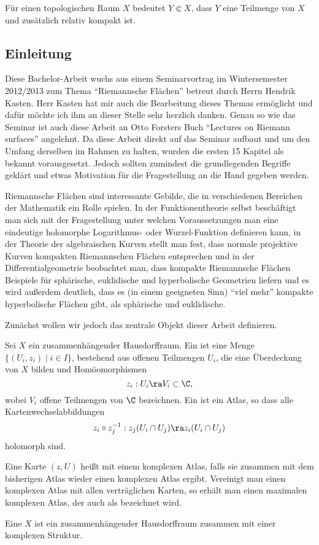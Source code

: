 Für einen topologischen Raum $X$ bedeutet $Y \Subset X$, dass $Y$
eine Teilmenge von $X$ und zusätzlich relativ kompakt ist.

\subsection{Einleitung}
\label{sec:einleitung}

Diese Bachelor-Arbeit wuchs aus einem Seminarvortrag im Wintersemester
2012/2013 zum Thema "`Riemannsche Flächen"' betreut durch Herrn Hendrik
Kasten. Herr Kasten hat mir auch die Bearbeitung dieses Themas
ermöglicht und dafür möchte ich ihm an dieser Stelle sehr herzlich
danken. Genau so wie das Seminar ist auch diese Arbeit an Otto Forsters
Buch "`Lectures on Riemann surfaces"' \cite{For} angelehnt. Da diese
Arbeit direkt auf das Seminar aufbaut und um den Umfang derselben im
Rahmen zu halten, wurden die ersten 15 Kapitel
als bekannt vorausgesetzt. Jedoch sollten zumindest die grundlegenden
Begriffe geklärt und etwas Motivation für die Fragestellung an
die Hand gegeben werden.

Riemannsche Flächen sind interessante Gebilde, die in verschiedenen
Bereichen der Mathematik ein Rolle spielen. In der Funktionentheorie
selbst beschäftigt man sich mit der Fragestellung unter welchen
Voraussetzungen man eine eindeutige holomorphe Logarithmus- oder
Wurzel-Funktion definieren kann, in der Theorie der algebraischen
Kurven stellt man fest, dass normale projektive Kurven
kompakten Riemannschen Flächen entsprechen und in der Differentialgeometrie
beobachtet man, dass kompakte Riemannsche Flächen Beispiele für
sphärische, euklidische und hyperbolische Geometrien liefern und es
wird außerdem deutlich, dass es (in einem geeigneten Sinn) "`viel
mehr"' kompakte hyperbolische Flächen gibt, als sphärische und euklidische.

Zunächst wollen wir jedoch das zentrale Objekt dieser Arbeit
definieren.

\begin{defin}
  \label{def:rf}
  Sei $X$ ein zusammenhängender Hausdorffraum. Ein 
  ist eine Menge $\{(U_i, z_i) \mid i \in I\}$, bestehend aus
  offenen Teilmengen $U_i$, die eine Überdeckung von $X$ bilden und
  Homöomorphismen
  \[
  z_i: U_i \ra V_i \subset \C,
  \]
  wobei $V_i$ offene Teilmengen von $\C$ bezeichnen. Ein
   ist ein Atlas, so dass alle
  Kartenwechselabbildungen
  \[
  z_i \circ z_j^{-1} : z_j(U_i \cap U_j) \ra z_i(U_i \cap U_j)
  \]
  holomorph sind.

  Eine Karte $(z,U)$ heißt  mit einem
  komplexen Atlas, falls sie zusammen mit dem bisherigen Atlas wieder
  einen komplexen Atlas ergibt. Vereinigt man einen komplexen Atlas mit allen
  verträglichen Karten, so erhält man einen maximalen komplexen
  Atlas, der auch als  bezeichnet wird.

  Eine  $X$ ist ein zusammenhängender
  Hausdorffraum zusammen mit einer komplexen Struktur.
\end{defin}

